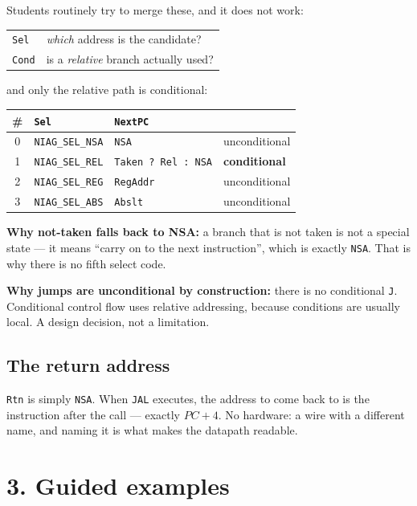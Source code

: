 \documentclass[11pt]{article}
\newcommand{\code}[1]{\texttt{#1}}
\begin{document}
Students routinely try to merge these, and it does not work:

\begin{center}
\begin{tabular}{ll}
\toprule
\code{Sel} & \emph{which} address is the candidate? \\
\code{Cond} & is a \emph{relative} branch actually used? \\
\bottomrule
\end{tabular}
\end{center}

and only the relative path is conditional:

\begin{center}
\begin{tabular}{cl@{\hskip 8pt}||@{\hskip 8pt}ll}
\toprule
\# & \code{Sel} & \code{NextPC} & \\
\midrule
0 & \code{NIAG\_SEL\_NSA} & \code{NSA} & unconditional \\
1 & \code{NIAG\_SEL\_REL} & \code{Taken ? Rel : NSA} & \textbf{conditional} \\
2 & \code{NIAG\_SEL\_REG} & \code{RegAddr} & unconditional \\
3 & \code{NIAG\_SEL\_ABS} & \code{Abslt} & unconditional \\
\bottomrule
\end{tabular}
\end{center}

\textbf{Why not-taken falls back to NSA:} a branch that is not taken is not a
special state --- it means ``carry on to the next instruction'', which is
exactly \code{NSA}. That is why there is no fifth select code.

\textbf{Why jumps are unconditional by construction:} there is no conditional
\code{J}. Conditional control flow uses relative addressing, because conditions
are usually local. A design decision, not a limitation.

\subsection*{The return address}

\code{Rtn} is simply \code{NSA}. When \code{JAL} executes, the address to come
back to is the instruction after the call --- exactly $PC+4$. No hardware: a
wire with a different name, and naming it is what makes the datapath readable.

\section*{3. Guided examples}
\end{document}
